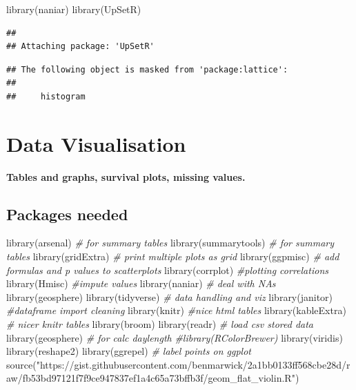 \documentclass[
]{article}
\newenvironment{Shaded}{\begin{snugshade}}{\end{snugshade}}
\newcommand{\CommentTok}[1]{\textcolor[rgb]{0.56,0.35,0.01}{\textit{#1}}}
\newcommand{\FunctionTok}[1]{\textcolor[rgb]{0.00,0.00,0.00}{#1}}
\newcommand{\NormalTok}[1]{#1}
\newcommand{\StringTok}[1]{\textcolor[rgb]{0.31,0.60,0.02}{#1}}
\begin{document}
\begin{Shaded}
\begin{Highlighting}[]
\FunctionTok{library}\NormalTok{(naniar)}
\FunctionTok{library}\NormalTok{(UpSetR)}
\end{Highlighting}
\end{Shaded}

\begin{verbatim}
## 
## Attaching package: 'UpSetR'
\end{verbatim}

\begin{verbatim}
## The following object is masked from 'package:lattice':
## 
##     histogram
\end{verbatim}

\hypertarget{data-visualisation}{%
\section{Data Visualisation}\label{data-visualisation}}

\textbf{Tables and graphs, survival plots, missing values.}

\hypertarget{packages-needed}{%
\subsection{Packages needed}\label{packages-needed}}

\begin{Shaded}
\begin{Highlighting}[]
\FunctionTok{library}\NormalTok{(arsenal) }\CommentTok{\# for summary tables}
\FunctionTok{library}\NormalTok{(summarytools) }\CommentTok{\# for summary tables}
\FunctionTok{library}\NormalTok{(gridExtra) }\CommentTok{\# print multiple plots as grid}
\FunctionTok{library}\NormalTok{(ggpmisc) }\CommentTok{\# add formulas and p values to scatterplots}
\FunctionTok{library}\NormalTok{(corrplot) }\CommentTok{\#plotting correlations}
\FunctionTok{library}\NormalTok{(Hmisc) }\CommentTok{\#impute values}
\FunctionTok{library}\NormalTok{(naniar) }\CommentTok{\# deal with NAs}
\FunctionTok{library}\NormalTok{(geosphere)}
\FunctionTok{library}\NormalTok{(tidyverse) }\CommentTok{\# data handling and viz}
\FunctionTok{library}\NormalTok{(janitor) }\CommentTok{\#dataframe import cleaning}
\FunctionTok{library}\NormalTok{(knitr) }\CommentTok{\#nice html tables}
\FunctionTok{library}\NormalTok{(kableExtra) }\CommentTok{\# nicer knitr tables}
\FunctionTok{library}\NormalTok{(broom)}
\FunctionTok{library}\NormalTok{(readr) }\CommentTok{\# load csv stored data}
\FunctionTok{library}\NormalTok{(geosphere) }\CommentTok{\# for calc daylength}
\CommentTok{\#library(RColorBrewer)}
\FunctionTok{library}\NormalTok{(viridis)}
\FunctionTok{library}\NormalTok{(reshape2)}
\FunctionTok{library}\NormalTok{(ggrepel) }\CommentTok{\# label points on ggplot}
\FunctionTok{source}\NormalTok{(}\StringTok{"https://gist.githubusercontent.com/benmarwick/2a1bb0133ff568cbe28d/raw/fb53bd97121f7f9ce947837ef1a4c65a73bffb3f/geom\_flat\_violin.R"}\NormalTok{)}
\end{Highlighting}
\end{Shaded}
\end{document}
